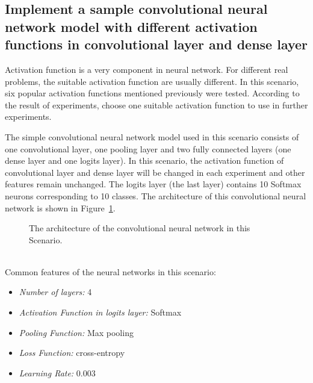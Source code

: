 \documentclass[]{UCD_CS_FYP_Report}
\begin{document}
\subsection{Implement a sample convolutional neural network model with different activation functions in convolutional layer and dense layer}
Activation function is a very component in neural network. For different real problems, the suitable activation function are usually different. In this scenario, six popular activation functions mentioned previously were tested. According to the result of experiments, choose one suitable activation function to use in further experiments. 

The simple convolutional neural network model used in this scenario consists of one convolutional layer, one pooling layer and two fully connected layers (one dense layer and one logits layer). In this scenario, the activation function of convolutional layer and dense layer will be changed in each experiment and other features remain unchanged. The logits layer (the last layer) contains 10 Softmax neurons corresponding to 10 classes. The architecture of this convolutional neural network is shown in Figure~\ref{fig:MNIST_CNN_S1_Architecture}. 
\begin{figure}[h]
\centering
\fboxsep 2mm
\caption{\label{fig:MNIST_CNN_S1_Architecture} The architecture of the convolutional neural network in this Scenario.}
\end{figure}
\\Common features of the neural networks in this scenario:
\begin{itemize}
\item {\sl Number of layers: } 4
\item {\sl Activation Function in logits layer:} Softmax
\item {\sl Pooling Function:} Max pooling
\item {\sl Loss Function:} cross-entropy
\item {\sl Learning Rate: } 0.003
\end{itemize}
%
\end{document}
